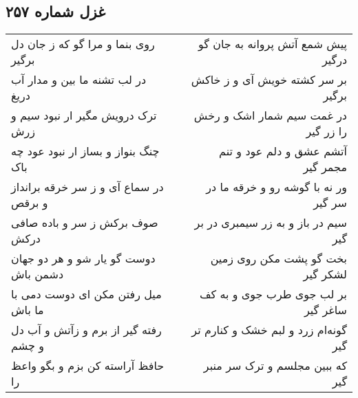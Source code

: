 \begin{center}
\section*{غزل شماره ۲۵۷}
\label{sec:sh257}
\begin{longtable}{l p{0.5cm} r}
روی بنما و مرا گو که ز جان دل برگیر
&&
پیش شمع آتش پروانه به جان گو درگیر
\\
در لب تشنه ما بین و مدار آب دریغ
&&
بر سر کشته خویش آی و ز خاکش برگیر
\\
ترک درویش مگیر ار نبود سیم و زرش
&&
در غمت سیم شمار اشک و رخش را زر گیر
\\
چنگ بنواز و بساز ار نبود عود چه باک
&&
آتشم عشق و دلم عود و تنم مجمر گیر
\\
در سماع آی و ز سر خرقه برانداز و برقص
&&
ور نه با گوشه رو و خرقه ما در سر گیر
\\
صوف برکش ز سر و باده صافی درکش
&&
سیم در باز و به زر سیمبری در بر گیر
\\
دوست گو یار شو و هر دو جهان دشمن باش
&&
بخت گو پشت مکن روی زمین لشکر گیر
\\
میل رفتن مکن ای دوست دمی با ما باش
&&
بر لب جوی طرب جوی و به کف ساغر گیر
\\
رفته گیر از برم و زآتش و آب دل و چشم
&&
گونه‌ام زرد و لبم خشک و کنارم تر گیر
\\
حافظ آراسته کن بزم و بگو واعظ را
&&
که ببین مجلسم و ترک سر منبر گیر
\\
\end{longtable}
\end{center}
